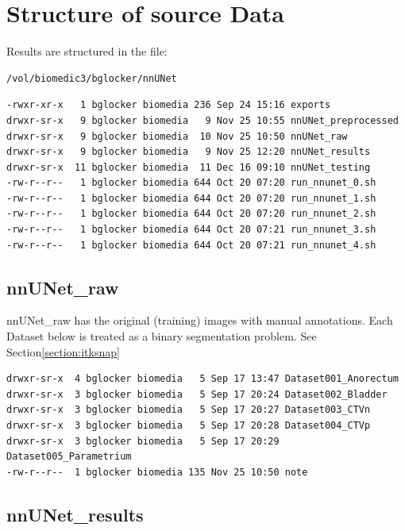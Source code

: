 \documentclass[11pt]{article}
\begin{document}


\tableofcontents

\clearpage

\section{Structure of source Data}

Results are structured in the file:

\begin{lstlisting}[language=bash]
/vol/biomedic3/bglocker/nnUNet
\end{lstlisting}

\begin{lstlisting}[language=inform]
-rwxr-xr-x   1 bglocker biomedia 236 Sep 24 15:16 exports
drwxr-sr-x   9 bglocker biomedia   9 Nov 25 10:55 nnUNet_preprocessed
drwxr-sr-x   9 bglocker biomedia  10 Nov 25 10:50 nnUNet_raw
drwxr-sr-x   9 bglocker biomedia   9 Nov 25 12:20 nnUNet_results
drwxr-sr-x  11 bglocker biomedia  11 Dec 16 09:10 nnUNet_testing
-rw-r--r--   1 bglocker biomedia 644 Oct 20 07:20 run_nnunet_0.sh
-rw-r--r--   1 bglocker biomedia 644 Oct 20 07:20 run_nnunet_1.sh
-rw-r--r--   1 bglocker biomedia 644 Oct 20 07:20 run_nnunet_2.sh
-rw-r--r--   1 bglocker biomedia 644 Oct 20 07:21 run_nnunet_3.sh
-rw-r--r--   1 bglocker biomedia 644 Oct 20 07:21 run_nnunet_4.sh
\end{lstlisting}

\subsection{nnUNet\_raw}\label{section:raw}

nnUNet\_raw has the original (training) images with manual annotations. Each Dataset below is treated as a binary segmentation problem. See Section\ref{section:itksnap}

\begin{lstlisting}[language=inform]
drwxr-sr-x  4 bglocker biomedia   5 Sep 17 13:47 Dataset001_Anorectum
drwxr-sr-x  3 bglocker biomedia   5 Sep 17 20:24 Dataset002_Bladder
drwxr-sr-x  3 bglocker biomedia   5 Sep 17 20:27 Dataset003_CTVn
drwxr-sr-x  3 bglocker biomedia   5 Sep 17 20:28 Dataset004_CTVp
drwxr-sr-x  3 bglocker biomedia   5 Sep 17 20:29 Dataset005_Parametrium
-rw-r--r--  1 bglocker biomedia 135 Nov 25 10:50 note
\end{lstlisting}

\subsection{nnUNet\_results}
\end{document}
